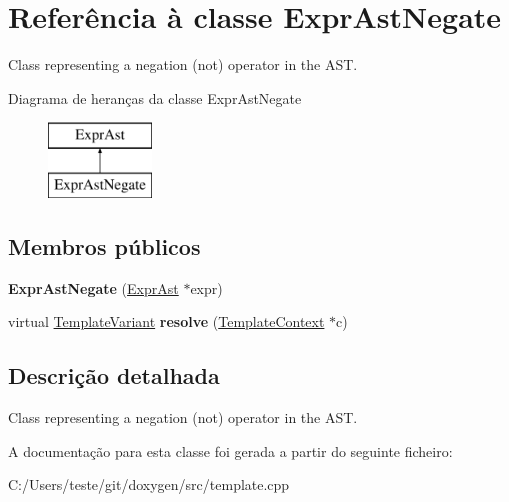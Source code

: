 \hypertarget{class_expr_ast_negate}{\section{Referência à classe Expr\-Ast\-Negate}
\label{class_expr_ast_negate}
}


Class representing a negation (not) operator in the A\-S\-T.  


Diagrama de heranças da classe Expr\-Ast\-Negate\begin{figure}[H]
\begin{center}
\leavevmode
\includegraphics[height=2.000000cm]{class_expr_ast_negate}
\end{center}
\end{figure}
\subsection*{Membros públicos}
\begin{DoxyCompactItemize}
\item 
\hypertarget{class_expr_ast_negate_a11c436458b10e789b80cc445761e4a5e}{{\bfseries Expr\-Ast\-Negate} (\hyperlink{class_expr_ast}{Expr\-Ast} $\ast$expr)}\label{class_expr_ast_negate_a11c436458b10e789b80cc445761e4a5e}

\item 
\hypertarget{class_expr_ast_negate_a19e3231655a2513f6467bc2b7cf1a9ed}{virtual \hyperlink{class_template_variant}{Template\-Variant} {\bfseries resolve} (\hyperlink{class_template_context}{Template\-Context} $\ast$c)}\label{class_expr_ast_negate_a19e3231655a2513f6467bc2b7cf1a9ed}

\end{DoxyCompactItemize}


\subsection{Descrição detalhada}
Class representing a negation (not) operator in the A\-S\-T. 

A documentação para esta classe foi gerada a partir do seguinte ficheiro\-:\begin{DoxyCompactItemize}
\item 
C\-:/\-Users/teste/git/doxygen/src/template.\-cpp\end{DoxyCompactItemize}
